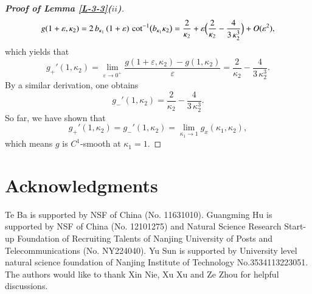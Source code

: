 \documentclass[11pt,leqno]{article}
\numberwithin{equation}{section}
\theoremstyle{definition}
\begin{document}
\begin{proof}[\textbf{Proof of Lemma \ref{L-3-3}($ii$)}]
\[
g(1+\varepsilon, \kappa_2)
= 2\,b_{\kappa_1}\,(1+\varepsilon)\,\cot^{-1}\bigl(b_{\kappa_1}\kappa_2\bigr)
= \frac{2}{\kappa_2}
+ \varepsilon\Bigl(\frac{2}{\kappa_2} - \frac{4}{3\,\kappa_2^3}\Bigr)
+ O(\varepsilon^2),
\]
which yields that
\[
g_+'(1,\kappa_2)
= \lim_{\varepsilon \to 0^+} \frac{g(1+\varepsilon, \kappa_2) - g(1, \kappa_2)}{\varepsilon}
= \frac{2}{\kappa_2} - \frac{4}{3\,\kappa_2^3}.
\]
By a similar derivation, one obtains
\[g_-'(1,\kappa_2)=\frac{2}{\kappa_2} - \frac{4}{3\,\kappa_2^3}.\]
So far, we have shown that
\[g_+'(1,\kappa_2)=g_-'(1,\kappa_2)=\lim_{\kappa_1\to 1}g_x(\kappa_1,\kappa_2),\]
which means $g$ is $C^1$-smooth at $\kappa_1=1$.
\end{proof}











\section{Acknowledgments}
Te Ba is supported by NSF of China (No. 11631010). Guangming Hu is supported by NSF of China (No. 12101275) and Natural Science Research Start-up Foundation of Recruiting Talents of Nanjing University of Posts and Telecommunications (No. NY224040).  Yu Sun is supported by University level natural science foundation of Nanjing Institute of Technology  No.3534113223051. The authors would like to thank Xin Nie, Xu Xu and Ze Zhou for helpful discussions.
\end{document}

